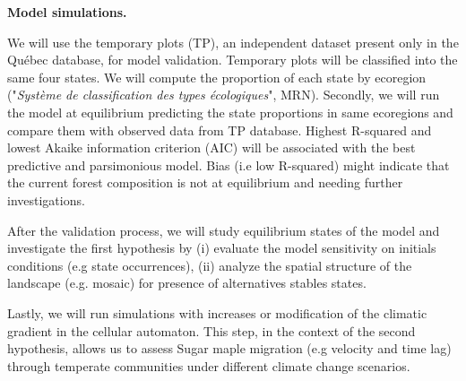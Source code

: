 

\textbf{Model simulations.} 


We will use the temporary plots (TP), an
independent  dataset present only in the Québec database, for model
validation. Temporary plots will be classified into the same four states. We
will compute the proportion of each state by ecoregion ("\textit{Système de
classification des types écologiques}", MRN). Secondly, we will run the model
at equilibrium predicting the state proportions in same ecoregions and compare
them with observed data from TP database. Highest R-squared and lowest Akaike
information criterion (AIC) will be associated with the best predictive and
parsimonious model. Bias (i.e low R-squared) might indicate that the current
forest composition is not at equilibrium and needing further investigations.

After the validation process, we will study equilibrium states of the model
and investigate the first hypothesis by (i) evaluate the model sensitivity on
initials conditions (e.g state occurrences), (ii) analyze the spatial
structure of the landscape (e.g. mosaic) for presence of alternatives stables
states. 


Lastly, we will run simulations with increases or modification of the
climatic gradient in the cellular automaton. This step, in the context of the
second hypothesis, allows us to assess Sugar maple migration (e.g velocity and
time lag) through  temperate communities under different climate change
scenarios.


\clearpage
\small

